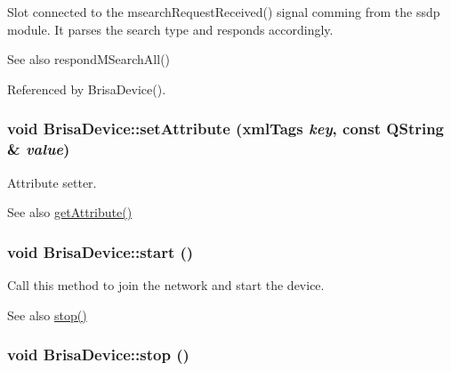Slot connected to the msearchRequestReceived() signal comming from the ssdp module. It parses the search type and responds accordingly.

\begin{DoxySeeAlso}{See also}
respondMSearchAll() 
\end{DoxySeeAlso}


Referenced by BrisaDevice().\hypertarget{classBrisaUpnp_1_1BrisaDevice_a5343b4ea851ba1eb444742df5dc6d3af}{
\subsubsection[{setAttribute}]{\setlength{\rightskip}{0pt plus 5cm}void BrisaDevice::setAttribute ({\bf xmlTags} {\em key}, \/  const QString \& {\em value})}}
\label{classBrisaUpnp_1_1BrisaDevice_a5343b4ea851ba1eb444742df5dc6d3af}


Attribute setter. \begin{DoxySeeAlso}{See also}
\hyperlink{classBrisaUpnp_1_1BrisaDevice_a7abbb69f5552c3fddcf1f31fd394696a}{getAttribute()} 
\end{DoxySeeAlso}
\hypertarget{classBrisaUpnp_1_1BrisaDevice_a5f6f1e5eeebfaf63ba0ac669ced3845c}{
\subsubsection[{start}]{\setlength{\rightskip}{0pt plus 5cm}void BrisaDevice::start ()}}
\label{classBrisaUpnp_1_1BrisaDevice_a5f6f1e5eeebfaf63ba0ac669ced3845c}


Call this method to join the network and start the device. \begin{DoxySeeAlso}{See also}
\hyperlink{classBrisaUpnp_1_1BrisaDevice_af42bba26bf50a602e55a5d4836501362}{stop()} 
\end{DoxySeeAlso}
\hypertarget{classBrisaUpnp_1_1BrisaDevice_af42bba26bf50a602e55a5d4836501362}{
\subsubsection[{stop}]{\setlength{\rightskip}{0pt plus 5cm}void BrisaDevice::stop ()}}
\label{classBrisaUpnp_1_1BrisaDevice_af42bba26bf50a602e55a5d4836501362}


